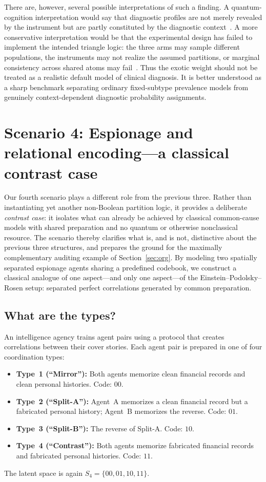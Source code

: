 \documentclass{article}
\begin{document}
There are, however, several possible interpretations of such a
finding. A quantum-cognition interpretation would say that diagnostic
profiles are not merely revealed by the instrument but are partly
constituted by the diagnostic context~\cite{Busemeyer2012}. A more
conservative interpretation would be that the experimental design has
failed to implement the intended triangle logic: the three arms may
sample different populations, the instruments may not realize the
assumed partitions, or marginal consistency across shared atoms may
fail~\cite{Garg1984}. Thus the exotic weight should not be treated as a realistic
default model of clinical diagnosis. It is better understood as a
sharp benchmark separating ordinary fixed-subtype prevalence models
from genuinely context-dependent diagnostic probability assignments.

\section{Scenario 4: Espionage and relational encoding---a classical
contrast case}
\label{sec:espionage}

Our fourth scenario plays a different role from the previous three.
Rather than instantiating yet another non-Boolean partition logic,
it provides a deliberate \emph{contrast case}: it isolates what can
already be achieved by classical common-cause models with shared
preparation and no quantum or otherwise nonclassical resource. The
scenario thereby clarifies what is, and is not, distinctive about
the previous three structures, and prepares the ground for the
maximally complementary auditing example of
Section~\ref{sec:org}. By modeling two spatially separated espionage
agents sharing a predefined codebook, we construct a classical
analogue of one aspect---and only one aspect---of the
Einstein--Podolsky--Rosen setup: separated perfect correlations
generated by common preparation.

\subsection{What are the types?}

An intelligence agency trains agent pairs using a protocol that
creates correlations between their cover stories. Each agent pair is
prepared in one of four coordination types:
\begin{itemize}
\item \textbf{Type~1 (``Mirror''):} Both agents memorize clean
financial records and clean personal histories. Code: $00$.
\item \textbf{Type~2 (``Split-A''):} Agent~A memorizes a clean
financial record but a fabricated personal history; Agent~B
memorizes the reverse. Code: $01$.
\item \textbf{Type~3 (``Split-B''):} The reverse of Split-A. Code:
$10$.
\item \textbf{Type~4 (``Contrast''):} Both agents memorize
fabricated financial records and fabricated personal histories.
Code: $11$.
\end{itemize}
The latent space is again $S_4=\{00,01,10,11\}$.
\end{document}
